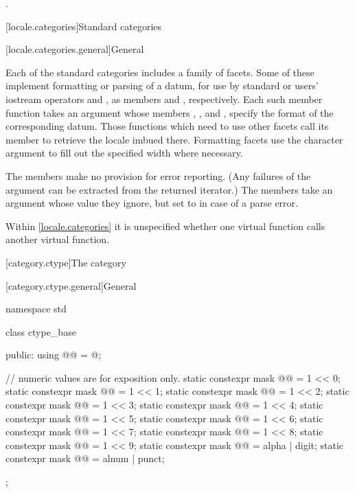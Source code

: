 \begin{itemdescr}
\pnum
\returns
{}.
\end{itemdescr}

[locale.categories]{Standard  categories}

[locale.categories.general]{General}

\pnum
Each of the standard categories includes a family of facets.
Some of these implement formatting or parsing of a datum,
for use by standard or users' iostream operators \tcode{<<} and \tcode{>>},
as members  and , respectively.
Each such member function takes an
%
 argument whose members
%
,
%
,
and
%
,
specify the format of the corresponding datum.
Those functions which need to use other facets call its member 
to retrieve the locale imbued there.
Formatting facets use the character argument 
to fill out the specified width where necessary.

\pnum
The  members make no provision for error reporting.
(Any failures of the  argument can be extracted from
the returned iterator.)
The  members take an  argument
whose value they ignore,
but set to  in case of a parse error.

\pnum
Within \ref{locale.categories} it is unspecified whether
one virtual function calls another virtual function.

[category.ctype]{The  category}

[category.ctype.general]{General}

%
\begin{codeblock}
namespace std {
  class ctype_base {
  public:
    using @@ = @\seebelow@;

    // numeric values are for exposition only.
    static constexpr mask @@  = 1 << 0;
    static constexpr mask @@  = 1 << 1;
    static constexpr mask @@  = 1 << 2;
    static constexpr mask @@  = 1 << 3;
    static constexpr mask @@  = 1 << 4;
    static constexpr mask @@  = 1 << 5;
    static constexpr mask @@  = 1 << 6;
    static constexpr mask @@  = 1 << 7;
    static constexpr mask @@ = 1 << 8;
    static constexpr mask @@  = 1 << 9;
    static constexpr mask @@  = alpha | digit;
    static constexpr mask @@  = alnum | punct;
  };
}
\end{codeblock}

